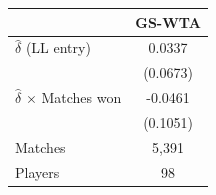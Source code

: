 \begin{tabular}{lc}
\toprule
 & GS-WTA \\
\midrule
$\hat{\delta}$ (LL entry) & 0.0337 \\
 & (0.0673) \\
$\hat{\delta}$ $\times$ Matches won & -0.0461 \\
 & (0.1051) \\
\midrule
Matches & 5,391 \\
Players & 98 \\
\bottomrule
\end{tabular}
